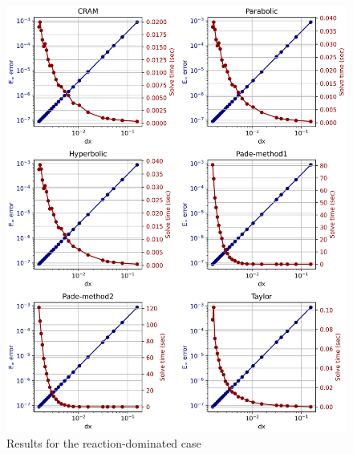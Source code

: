 \begin{figure}[p]
    \centering
    \includegraphics[width=5.0in]{images/chapter-5/progressionProblems/problem2/problem2b.png}
    \caption{Results for the reaction-dominated case}
    \label{fig:problem2_reaction_dom}
\end{figure}

\clearpage

